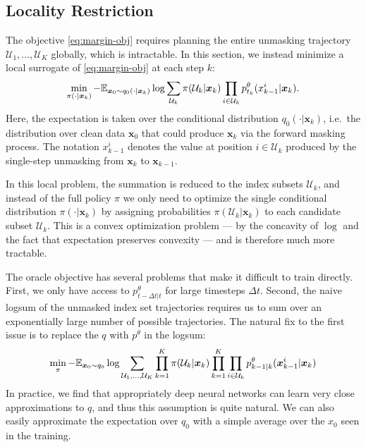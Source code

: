 \subsection{Locality Restriction}
The objective \eqref{eq:margin-obj} requires planning the entire unmasking trajectory $\mathcal U_1,\dots,\mathcal U_K$ globally, which is intractable. In this section, we instead minimize a local surrogate of \eqref{eq:margin-obj} at each step $k$:
\begin{align}
    \label{eq:oracle_confidence}
         \min_{\pi(\cdot|\bm x_k)} -\mathbb{E}_{\bm x_0\sim q_0(\cdot|\bm x_k)}\log\sum_{\mathcal U_k} \pi(\mathcal U_k|\bm x_k) \prod_{i\in\mathcal U_k}p^\theta_{t_k}(x_{k-1}^i|\bm x_k).
\end{align}
Here, the expectation is taken over the conditional distribution $q_0(\cdot|\bm x_k)$, i.e.\ the distribution over clean data $\bm x_0$ that could produce $\bm x_k$ via the forward masking process. The notation $x^i_{k-1}$ denotes the value at position $i\in\mathcal U_k$ produced by the single-step unmasking from $\bm x_k$ to $\bm x_{k-1}$.

In this local problem, the summation is reduced to the index subsets $\mathcal U_k$, and instead of the full policy $\pi$ we only need to optimize the single conditional distribution $\pi(\cdot|\bm x_k)$ by assigning probabilities $\pi(\mathcal U_k|\bm x_k)$ to each candidate subset $\mathcal U_k$. This is a convex optimization problem --- by the concavity of $\log$ and the fact that expectation preserves convexity \citep{boyd2004convex} --- and is therefore much more tractable.


\iffalse
The oracle objective has several problems that make it difficult to train directly. First, we only have access to  $p^\theta_{t-\Delta t|t}$ for large timesteps $\Delta t$. Second, the naive logsum of the unmasked index set trajectories requires us to sum over an exponentially large number of possible trajectories. The natural fix to the first issue is to replace the $q$ with $p^\theta$ in the logsum:
\begin{equation}
    \begin{split}
        \min_\pi -\mathbb{E}_{\bm x_0\sim q_0}\log \sum_{\substack{\mathcal U_1,...,\mathcal U_K}} \prod_{k=1}^{K} \pi(\mathcal U_{k}|\bm x_{k})\prod_{k=1}^{K} \prod_{i\in\mathcal U_{k}}p^\theta_{k-1|k}(\bm x^i_{k-1}|\bm x_{k})
    \end{split}
\end{equation}
In practice, we find that appropriately deep neural networks can learn very close approximations to $q$, and thus this assumption is quite natural. We can also easily approximate the expectation over $q_0$ with a simple average over the $x_0$ seen in the training.

